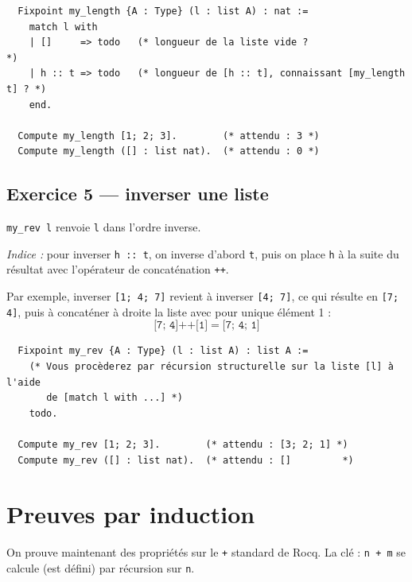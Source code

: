 \documentclass[11pt,a4paper]{article}
\newenvironment{exo}{
\begin{mdframed}[style=exostyle]}{
\end{mdframed}}
\newcommand{\cq}[1]{\texttt{#1}}
\begin{document}
\begin{exo}
\begin{verbatim}
  Fixpoint my_length {A : Type} (l : list A) : nat :=
    match l with
    | []     => todo   (* longueur de la liste vide ?                    *)
    | h :: t => todo   (* longueur de [h :: t], connaissant [my_length t] ? *)
    end.

  Compute my_length [1; 2; 3].        (* attendu : 3 *)
  Compute my_length ([] : list nat).  (* attendu : 0 *)
\end{verbatim}
\end{exo}

\subsection{Exercice 5 — inverser une liste}

\cq{my_rev l} renvoie \cq{l} dans l'ordre inverse.

\textit{Indice :} pour inverser \cq{h :: t}, on inverse d'abord \cq{t},
puis on place \cq{h} à la suite du résultat avec l'opérateur de
concaténation \cq{++}.

Par exemple, inverser \cq{[1; 4; 7]} revient à inverser \cq{[4; 7]},
ce qui résulte en \cq{[7; 4]}, puis à concaténer à droite la liste
avec pour unique élément 1 :
\[
  \cq{[7; 4]} \mathbin{\texttt{++}} \cq{[1]} = \cq{[7; 4; 1]}
\]

\begin{exo}
\begin{verbatim}
  Fixpoint my_rev {A : Type} (l : list A) : list A :=
    (* Vous procèderez par récursion structurelle sur la liste [l] à l'aide
       de [match l with ...] *)
    todo.

  Compute my_rev [1; 2; 3].        (* attendu : [3; 2; 1] *)
  Compute my_rev ([] : list nat).  (* attendu : []         *)
\end{verbatim}
\end{exo}

\section{Preuves par induction}

On prouve maintenant des propriétés sur le \cq{+} standard de Rocq.
La clé : \cq{n + m} se calcule (est défini) par récursion sur \cq{n}.
\end{document}
